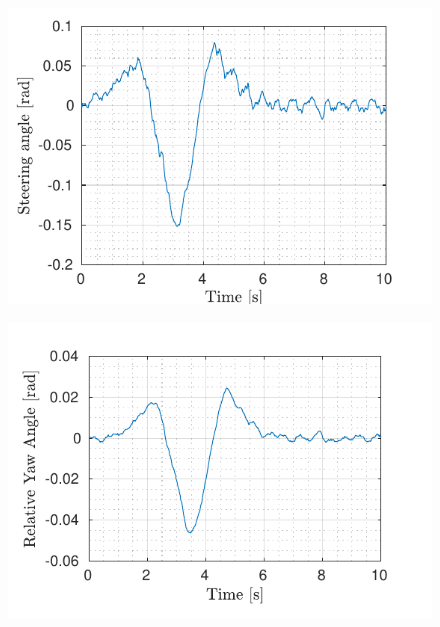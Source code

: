 \begin{figure}[!h]
\begin{minipage}[t]{0.49\textwidth}
		\includegraphics[width=\textwidth]{../../MATLAB/lane_following_curve/figure/SteeringAngleVsTime_curve.pdf}
		\label{fig:steering_laneFollowing_curve}
	\end{minipage}
	\begin{minipage}[t]{0.49\textwidth}
		\includegraphics[width=\textwidth]{../../MATLAB/lane_following_curve/figure/RelativeYawAngleVsTime_curve.pdf}
		\label{fig:relative_yaw_angle_laneFollowing_curve}
	\end{minipage}
	\begin{minipage}[t]{0.49\textwidth}

\end{minipage}
\end{figure}
